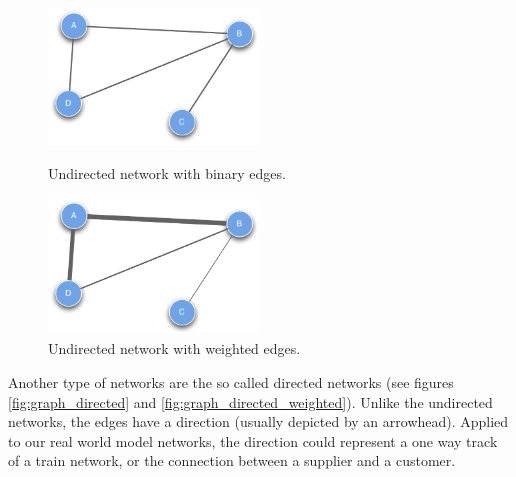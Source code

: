 \begin{figure}[htbp]
	\begin{minipage}[b]{0.5\textwidth}
    \captionsetup{width=.5\textwidth}
		\centering
			\includegraphics[width=0.5\textwidth]{assets/pdf/graph_undirected.pdf}
			\caption{Undirected network with binary edges.}
			\label{fig:graph_undirected}
	\end{minipage}
	\hspace{0.5cm}
	\begin{minipage}[b]{0.5\textwidth}
    \captionsetup{width=.5\textwidth}
		\centering
			\includegraphics[width=0.5\textwidth]{assets/pdf/graph_undirected_weighted.pdf}
			\caption{Undirected network with weighted edges.}
			\label{fig:graph_undirected_weighted}
	\end{minipage}
\end{figure}

Another type of networks are the so called directed networks (see figures \ref{fig:graph_directed} and \ref{fig:graph_directed_weighted}). Unlike the undirected networks, the edges have a direction (usually depicted by an arrowhead). Applied to our real world model networks, the direction could represent a one way track of a train network, or the connection between a supplier and a customer. 

